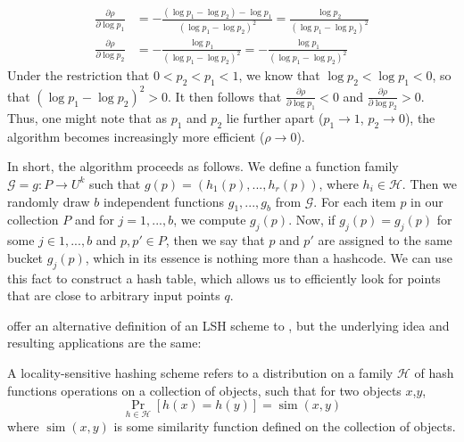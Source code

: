 \begin{equation}
    \begin{aligned}
    \frac{\partial \rho}{\partial \log{p_1}} &= - \frac{(\log{p_1} - \log{p_2}) -\log{p_1}}{(\log{p_1} - \log{p_2})^2} = \frac{ \log{p_2}}{(\log{p_1} - \log{p_2})^2} \\
    \frac{\partial \rho}{\partial \log{p_2}} &= - \frac{\log{p_1}}{(\log{p_1} - \log{p_2})^2} = - \frac{ \log{p_1}}{(\log{p_1} - \log{p_2})^2}
    \end{aligned}
    \label{eq:partial_derivatives_rho}
\end{equation}
Under the restriction that $0 < p_2 < p_1 < 1$, we know that $\log{p_2} < \log{p_1} < 0$, so that $(\log{p_1} - \log{p_2})^2 > 0$. It then follows that $\frac{\partial \rho}{\partial \log{p_1}} < 0$ and $\frac{\partial \rho}{\partial \log{p_2}} > 0$. Thus, one might note that as $p_1$ and $p_2$ lie further apart ($p_1 \rightarrow 1$, $p_2 \rightarrow 0$), the algorithm becomes increasingly more efficient ($\rho \rightarrow 0$). 

In short, the algorithm proceeds as follows. We define a function family $\mathcal{G} = {g: P\rightarrow U^k}$ such that $g(p) = (h_1(p),...,h_r(p))$, where $h_i\in\mathcal{H}$. Then we randomly draw $b$ independent functions $g_1,...,g_b$ from $\mathcal{G}$. For each item $p$ in our collection $P$ and for $j=1,...,b$, we compute $g_j(p)$. Now, if $g_j(p)=g_j(p)$ for some $j\in{1,...,b}$ and $p,p'\in P$, then we say that $p$ and $p'$ are assigned to the same bucket $g_j(p)$, which in its essence is nothing more than a hashcode. We can use this fact to construct a hash table, which allows us to efficiently look for points that are close to arbitrary input points $q$. 

\cite{Charikar02} offer an alternative definition of an LSH scheme to \cite{IndykM98}, but the underlying idea and resulting applications are the same:
\begin{definition}
A locality-sensitive hashing scheme refers to a distribution on a family $\mathcal{H}$ of hash functions operations on a collection of objects, such that for two objects $x$,$y$,
\begin{equation*}\label{def:LSH_2}
    \operatorname{Pr}_{h \in \mathcal{H}}[h(x)=h(y)]=\operatorname{sim}(x, y)
    \end{equation*}
where $\operatorname{sim}(x, y)$ is some similarity function defined on the collection of objects.
\label{def:lsh_charikar}
\end{definition}

